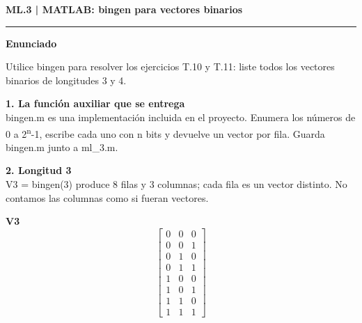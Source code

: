 \documentclass[11pt,a4paper,landscape]{article}
\newcommand{\titulo}[1]{{\LARGE\bfseries #1}\par\smallskip\hrule\medskip}
\begin{document}
\normalsize
\newpage{}\hypertarget{1.2-ML.3}{}
\titulo{ML.3 | MATLAB: bingen para vectores binarios}
\textbf{Enunciado}\par Utilice bingen para resolver los ejercicios T.10 y T.11: liste todos los vectores binarios de longitudes 3 y 4.
\par\medskip
\noindent\begin{minipage}{\linewidth}\textbf{1. La función auxiliar que se entrega}\\[2pt]bingen.m es una implementación incluida en el proyecto. Enumera los números de 0 a 2\textsuperscript{n}-1, escribe cada uno con n bits y devuelve un vector por fila. Guarda bingen.m junto a ml\_3.m.
\end{minipage}\par\medskip
\noindent\begin{minipage}{\linewidth}\textbf{2. Longitud 3}\\[2pt]V3 = bingen(3) produce 8 filas y 3 columnas; cada fila es un vector distinto. No contamos las columnas como si fueran vectores.
\par\smallskip \textbf{V3}\[\begin{bmatrix}0 & 0 & 0\\0 & 0 & 1\\0 & 1 & 0\\0 & 1 & 1\\1 & 0 & 0\\1 & 0 & 1\\1 & 1 & 0\\1 & 1 & 1\end{bmatrix}\]
\end{minipage}\par\medskip
\end{document}
